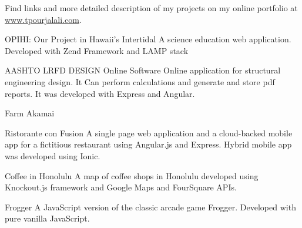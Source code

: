 
	Find links and more detailed description of my projects on my online portfolio at \mbox{\href{http:/www.tpourjalali.com}{www.tpourjalali.com}}.
\begin{cventries}
	\cventry
	{\faLaptop \enspace OPIHI: Our Project in Hawaii's Intertidal}
	{}
	{}
	{}
	{A science education web application. Developed with Zend Framework and LAMP stack}
	
	\cventry
	{\faLaptop\enspace AASHTO LRFD DESIGN Online Software}
	{}
	{}
	{}
	{Online application for structural engineering design. It Can perform calculations and generate and store pdf reports. It was developed with Express and Angular. }
	
	\cventry
	{\faAndroid\enspace Farm Akamai}
	{}
	{}
	{}
	{}
	
	\cventry
	{\faAndroid \faLaptop\enspace Ristorante con Fusion
	}
	{}
	{}
	{}
	{A single page web application and a cloud-backed mobile app for a fictitious restaurant using Angular.js and Express. Hybrid mobile app was developed using Ionic.}

	\cventry
	{\faLaptop\enspace Coffee in Honolulu
	}
	{}
	{}
	{}
	{A map of coffee shops in Honolulu developed using Knockout.js framework and Google Maps and FourSquare APIs.}

	\cventry
	{\faLaptop\enspace Frogger
	}
	{}
	{}
	{}
	{A JavaScript version of the classic arcade game Frogger. Developed with pure vanilla JavaScript.}



\end{cventries}
